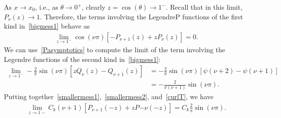 \documentclass[final]{siamltex}
\newcommand{\C}{C_k}
\begin{document}
As $x\rightarrow x_{0}$, i.e., as $\theta \rightarrow 0^{+}$, clearly
$z=\cos(\theta)\rightarrow 1^{-}$. Recall that in this limit, $P_\nu(z)
\rightarrow 1.$ Therefore, the terms involving the LegendreP functions
of the first kind in~\eqref{bigmess1} behave as 
\begin{align} 
  \label{smallermess1}
  \lim_{z \rightarrow 1^- }\cos(\nu\pi)\left[ -P_{\nu+1}(z)+ z P_\nu(z)
  \right]  = 0.
\end{align}
We can use~\eqref{Pasymptotics} to compute the limit of the term involving the Legendre functions of the second kind in~\eqref{bigmess1}:
\begin{align}
  \lim_{z \rightarrow 1^{-}} 
    -\frac{2}{\pi}\sin(\nu\pi)\left[zQ_\nu\left(z\right) - 
    Q_{\nu+1}\left(z\right)\right] 
  &= -\frac{2}{\pi}\sin(\nu\pi)\left[
    \psi(\nu+2)-\psi(\nu+1) \right] \\
  &= -\frac{2}{\pi (\nu+1)}\sin(\nu \pi).
  \label{smallermess2}
\end{align}
Putting together~\eqref{smallermess1},~\eqref{smallermess2},
and~\eqref{curlT}, we have
\begin{align} 
  \label{doublelayerwithz}
  \lim_{z\rightarrow 1-}\C(\nu+1)\left[ P_{\nu+1}(-z)+zP{-\nu}(-z)\right] =
    \C \frac{2}{\pi} \sin(\nu \pi).
\end{align}
\end{document}
